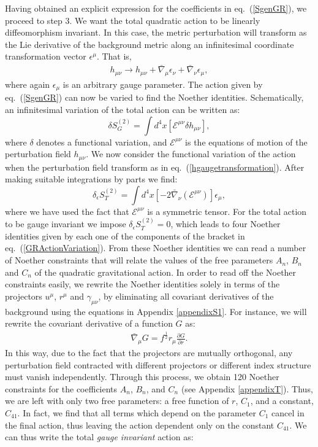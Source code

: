 \documentclass[10pt,twocolumn,preprintnumbers,amsmath,amssymb,nofootinbib
,superscriptaddress]{revtex4-1}
\begin{document}
Having obtained an explicit expression for the coefficients in eq.~(\ref{SgenGR}), we proceed to step 3. We want the total quadratic action to be linearly diffeomorphism invariant. In this case, the metric perturbation will transform as the Lie derivative of the background metric along an infinitesimal coordinate transformation vector $\epsilon^\mu$. That is,
\begin{align}
 h_{\mu\nu}\rightarrow h_{\mu\nu}+\bar{\nabla}_\mu\epsilon_\nu+\bar{\nabla}_\nu\epsilon_\mu, \label{hgaugetransformation}
\end{align}
where again $\epsilon_\mu$ is an arbitrary gauge parameter.
 The action given by eq.~(\ref{SgenGR}) can now be varied to find the Noether identities. Schematically, an infinitesimal variation of the total action can be written as:
\begin{equation}
\delta S^{(2)}_G=\int d^4x \left[ \mathcal{E}^{\mu\nu} \delta h_{\mu\nu}\right],
\end{equation}
where $\delta$ denotes a functional variation, and $\mathcal{E}^{\mu\nu}$ is the equations of motion of the perturbation field $h_{\mu\nu}$. We now consider the functional variation of the action when the perturbation field transform as in eq.~(\ref{hgaugetransformation}). After making suitable integrations by parts we find:
\begin{equation}\label{GRActionVariation}
\delta_\epsilon S^{(2)}_T= \int d^4x\left[ -2\bar{\nabla}_\nu\left(\mathcal{E}^{\mu\nu}\right)\right]\epsilon_\mu,
\end{equation}
where we have used the fact that $\mathcal{E}^{\mu\nu}$ is a symmetric tensor. For the total action to be gauge invariant we impose $\delta_\epsilon S^{(2)}_T=0$, which leads to four Noether identities given by each one of the components of the bracket in eq.~(\ref{GRActionVariation}). From these Noether identities we can read a number of Noether constraints that will relate the values of the free parameters $A_n$, $B_n$ and $C_n$ of the quadratic gravitational action. In order to read off the Noether constraints easily, we rewrite the Noether identities solely in terms of the projectors $u^\mu$, $r^\mu$ and $\gamma_{\mu\nu}$, by eliminating all covariant derivatives of the background using the equations in Appendix \ref{appendixS1}. For instance, we will rewrite the covariant derivative of a function $G$ as:
\begin{align}
\bar{\nabla}_\mu G=f^{\frac{1}{2}}r_\mu\frac{\partial G}{\partial r}.
\end{align}
In this way, due to the fact that the projectors are mutually orthogonal, any perturbation field contracted with different projectors or different index structure must vanish independently. Through this process, we obtain 120 Noether constraints for the coefficients $A_n$, $B_n$, and $C_n$ (see Appendix \ref{appendixT}). Thus, we are left with only two free parameters: a free function of $r$, $C_1$, and a constant, $C_{41}$. In fact, we find that all terms which depend on the parameter $C_1$ cancel in the final action, thus leaving the action dependent only on the constant $C_{41}$. We can thus write the total \textit{gauge invariant} action as:
\end{document}
